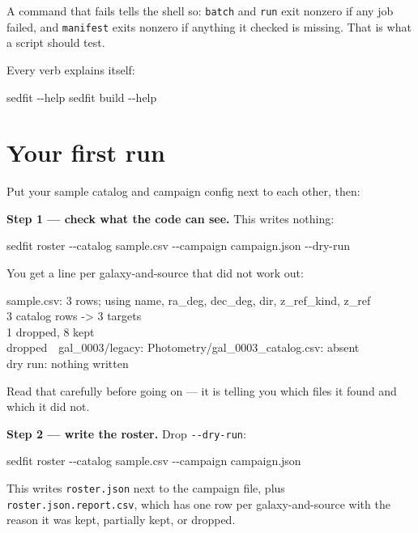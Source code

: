 \documentclass[11pt]{article}
\newcommand{\cmdline}[1]{\begin{cmd}\ttfamily #1\end{cmd}}
\begin{document}
A command that fails tells the shell so: \texttt{batch} and \texttt{run}
exit nonzero if any job failed, and \texttt{manifest} exits nonzero if
anything it checked is missing. That is what a script should test.

Every verb explains itself:

\cmdline{sedfit -{}-help \qquad sedfit build -{}-help}

\section{Your first run}

Put your sample catalog and campaign config next to each other, then:

\textbf{Step 1 --- check what the code can see.} This writes nothing:

\begin{cmd}\ttfamily
sedfit roster -{}-catalog sample.csv -{}-campaign campaign.json -{}-dry-run
\end{cmd}

You get a line per galaxy-and-source that did not work out:

\begin{cmd}\ttfamily
sample.csv: 3 rows; using name, ra\_deg, dec\_deg, dir, z\_ref\_kind, z\_ref\\
3 catalog rows -> 3 targets\\
\hspace*{2em}1 dropped, 8 kept\\
\hspace*{2em}dropped~~gal\_0003/legacy: Photometry/gal\_0003\_catalog.csv: absent\\
dry run: nothing written
\end{cmd}

Read that carefully before going on --- it is telling you which files it
found and which it did not.

\textbf{Step 2 --- write the roster.} Drop \texttt{-{}-dry-run}:

\begin{cmd}\ttfamily
sedfit roster -{}-catalog sample.csv -{}-campaign campaign.json
\end{cmd}

This writes \texttt{roster.json} next to the campaign file, plus
\texttt{roster.json.report.csv}, which has one row per galaxy-and-source
with the reason it was kept, partially kept, or dropped.
\end{document}
